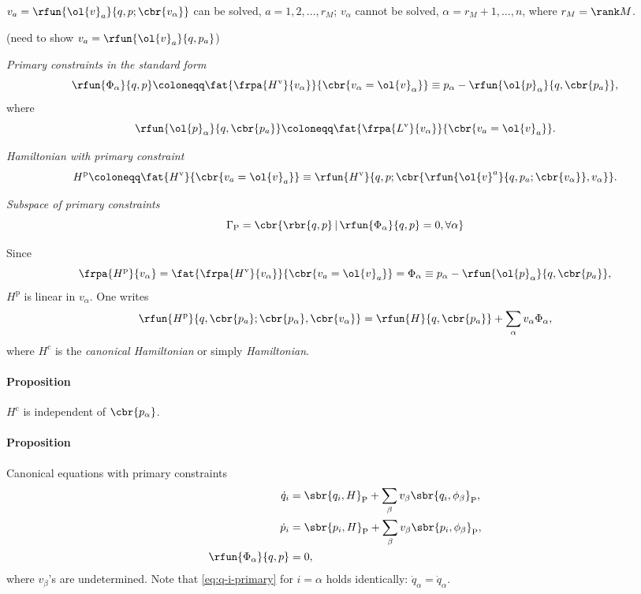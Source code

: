 \documentclass[a4paper,11pt]{article}
\begin{document}
$v_a = \rfun{\ol{v}_a}{q,p;\cbr{v_\alpha}}$ can be solved, $a = 1, 2, \ldots, 
r_M$; $v_\alpha$ 
cannot be solved, $\alpha = r_M + 1, \ldots, n$, where $r_M = \rank M$.

(need to show $v_a = \rfun{\ol{v}_a}{q,p_a}$)

\emph{Primary constraints in the standard form}
\begin{equation}
\rfun{\Phi_\alpha}{q, p} \coloneqq
\fat{\frpa{H^\text{v}}{v_\alpha}}{\cbr{v_\alpha = \ol{v}_\alpha}} \equiv
p_\alpha - \rfun{\ol{p}_\alpha}{q, \cbr{p_a}},
\end{equation}
where
\begin{equation}
\rfun{\ol{p}_\alpha}{q, \cbr{p_a}} 
\coloneqq \fat{\frpa{L^\text{v}}{v_\alpha}}{\cbr{v_a = \ol{v}_a}}.
\end{equation}


\emph{Hamiltonian with primary constraint}
\begin{equation}
H^\text{p} \coloneqq \fat{H^\text{v}}{\cbr{v_a = \ol{v}_a}} \equiv
\rfun{H^\text{v}}{q, p; \cbr{\rfun{\ol{v}^a}{q, p_a; \cbr{v_\alpha}}, 
v_\alpha}}.
\end{equation}

\emph{Subspace of primary constraints}
\begin{equation}
\Gamma_\text{P} = \cbr{ \rbr{q, p}\, |\, \rfun{\Phi_\alpha}{q, p} = 0, 
\forall \alpha}
\end{equation}

Since
\begin{equation}
\frpa{H^\text{p}}{v_\alpha} =
\fat{\frpa{H^\text{v}}{v_\alpha}}{\cbr{v_a = \ol{v}_a}} = \Phi_\alpha
\equiv p_\alpha - \rfun{\ol{p}_\alpha}{q, \cbr{p_a}},
\end{equation}
$H^\text{p}$ is linear in $v_\alpha$. One writes
\begin{equation}
\rfun{H^\text{p}}{q, \cbr{p_a}; \cbr{p_\alpha}, \cbr{v_\alpha}} = \rfun{H}{q, 
\cbr{p_a}} + \sum_\alpha v_\alpha \Phi_\alpha,
\end{equation}
where $H^\text{c}$ is the \emph{canonical Hamiltonian} or simply 
\emph{Hamiltonian}.

\paragraph{Proposition}
$H^\text{c}$ is independent of $\cbr{p_\alpha}$.

\paragraph{Proposition}
Canonical equations with primary constraints
\begin{align}
\dot{q}_i &= \sbr{q_i, H}_\text{P} + \sum_\beta v_\beta 
\sbr{q_i, \phi_\beta}_\text{P},
\label{eq:q-i-primary}\\
\dot{p}_i &= \sbr{p_i, H}_\text{P} + \sum_\beta v_\beta 
\sbr{p_i, \phi_\beta}_\text{P}, \\
\rfun{\Phi_\alpha}{q, p} &= 0,
\end{align}
where $v_\beta$'s are undetermined. Note that \cref{eq:q-i-primary} for $i = 
\alpha$ holds identically: $\dot{q}_\alpha = \dot{q}_\alpha$.
\end{document}
